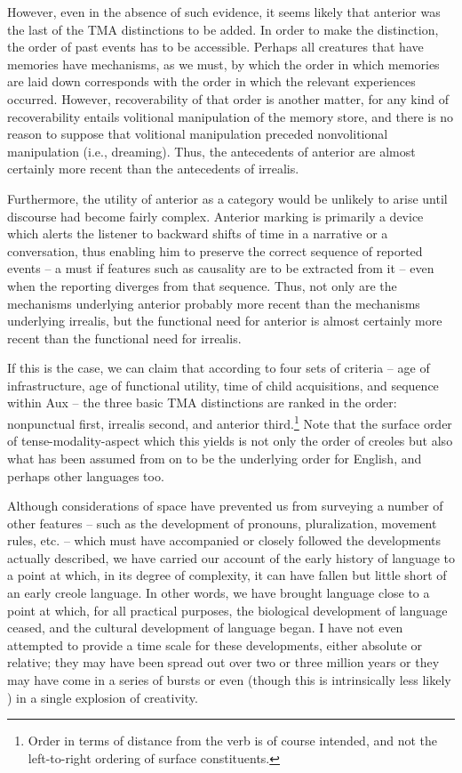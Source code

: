 
However, even in the absence of such evidence, it seems likely that anterior was the last of the TMA distinctions to be added. In order to make the distinction, the order of past events has to be accessible. Perhaps all creatures that have memories have mechanisms, as we must, by which the order in which memories are laid down corresponds with the order in which the relevant experiences occurred. However, recoverability of that order is another matter, for any kind of recoverability entails volitional manipulation of the memory store, and there is no reason to suppose that volitional manipulation preceded nonvolitional manipulation (i.e., dreaming). Thus, the antecedents of anterior are almost certainly more recent than the antecedents of irrealis.

Furthermore, the utility of anterior as a category would be unlikely to arise until discourse had become fairly complex. Anterior marking is primarily a device which alerts the listener to backward shifts of time in a narrative or a conversation, thus enabling him to preserve the correct sequence of reported events -- a must if features such as causality are to be extracted from it -- even when the reporting diverges from that sequence. Thus, not only are the mechanisms under\-lying anterior probably more recent than the mechanisms underlying irrealis, but the functional need for anterior is almost certainly more recent than the functional need for irrealis.

If this is the case, we can claim that according to four sets of criteria -- age of infrastructure, age of functional utility, time of child acquisitions, and sequence within Aux -- the three basic TMA distinctions are ranked in the order: nonpunctual first, irrealis second, and anterior third.\footnote{Order in terms of distance from the verb is of course intended, and not the left-to-right ordering of surface constituents.} Note that the surface order of tense-modality-aspect which this yields is not only the order of creoles but also what has been assumed from \citet{Chomsky1957} on to be the underlying order for English, and perhaps other languages too.

Although considerations of space have prevented us from survey\-ing a number of other features -- such as the development of pronouns, pluralization, movement rules, etc. -- which must have accompanied or closely followed the developments actually described, we have carried our account of the early history of language to a point at which, in its
degree of complexity, it can have fallen but little short of an early creole language. In other words, we have brought language close to a point at which, for all practical purposes, the biological development of language ceased, and the cultural development of language began. I have not even attempted to provide a time scale for these develop\-ments, either absolute or relative; they may have been spread out over two or three million years or they may have come in a series of bursts or even (though this is intrinsically less likely ) in a single explosion of creativity.

